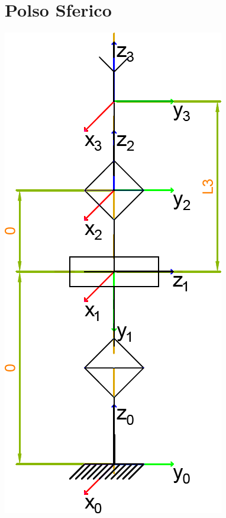 \documentclass[a4paper,11pt]{article}
\begin{document}
\section*{Polso Sferico}
\includegraphics{Sorgenti/Strutture/PolsoSferico.png}

\end{document}
